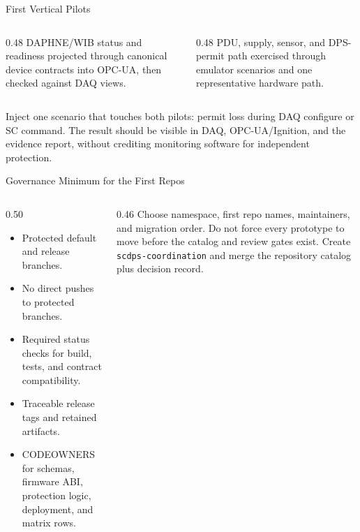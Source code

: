 \documentclass[aspectratio=169,10pt]{beamer}
\begin{document}
\begin{frame}{First Vertical Pilots}
\begin{columns}[T,onlytextwidth]
  \begin{column}{0.48\textwidth}
      {DAPHNE/WIB status and readiness projected through canonical device contracts into OPC-UA, then checked against DAQ views.}
      {\hspace{1mm}}
  \end{column}
  \begin{column}{0.48\textwidth}
      {PDU, supply, sensor, and DPS-permit path exercised through emulator scenarios and one representative hardware path.}
      {\hspace{1mm}}
  \end{column}
\end{columns}
\vspace{4mm}
  {Inject one scenario that touches both pilots: permit loss during DAQ configure or SC command. The result should be visible in DAQ, OPC-UA/Ignition, and the evidence report, without crediting monitoring software for independent protection.}
  {}
\end{frame}

\begin{frame}{Governance Minimum for the First Repos}
\begin{columns}[T,onlytextwidth]
  \begin{column}{0.50\textwidth}
    \begin{itemize}
      \DuneTightList
      \item Protected default and release branches.
      \item No direct pushes to protected branches.
      \item Required status checks for build, tests, and contract compatibility.
      \item Traceable release tags and retained artifacts.
      \item CODEOWNERS for schemas, firmware ABI, protection logic, deployment, and matrix rows.
    \end{itemize}
  \end{column}
  \begin{column}{0.46\textwidth}
      {Choose namespace, first repo names, maintainers, and migration order.}
      {}
    \vspace{1.5mm}
      {Do not force every prototype to move before the catalog and review gates exist.}
      {}
    \vspace{1.5mm}
      {Create \texttt{scdps-coordination} and merge the repository catalog plus decision record.}
      {}
  \end{column}
\end{columns}
\end{frame}
\end{document}
